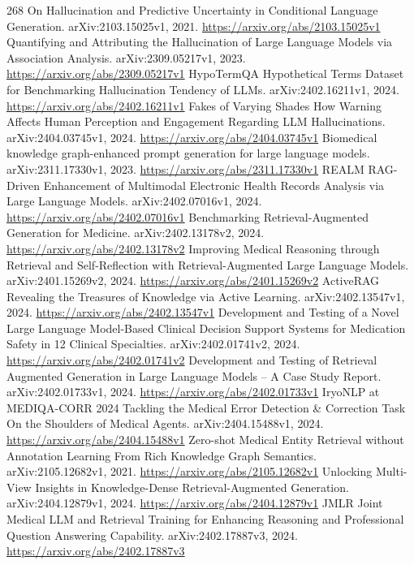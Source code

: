 \documentclass[11pt]{article}
\begin{document}
\begin{thebibliography}{268}
 On Hallucination and Predictive Uncertainty in Conditional Language Generation. arXiv:2103.15025v1, 2021. \url{https://arxiv.org/abs/2103.15025v1}
 Quantifying and Attributing the Hallucination of Large Language Models via Association Analysis. arXiv:2309.05217v1, 2023. \url{https://arxiv.org/abs/2309.05217v1}
 HypoTermQA Hypothetical Terms Dataset for Benchmarking Hallucination Tendency of LLMs. arXiv:2402.16211v1, 2024. \url{https://arxiv.org/abs/2402.16211v1}
 Fakes of Varying Shades How Warning Affects Human Perception and Engagement Regarding LLM Hallucinations. arXiv:2404.03745v1, 2024. \url{https://arxiv.org/abs/2404.03745v1}
 Biomedical knowledge graph-enhanced prompt generation for large language models. arXiv:2311.17330v1, 2023. \url{https://arxiv.org/abs/2311.17330v1}
 REALM RAG-Driven Enhancement of Multimodal Electronic Health Records Analysis via Large Language Models. arXiv:2402.07016v1, 2024. \url{https://arxiv.org/abs/2402.07016v1}
 Benchmarking Retrieval-Augmented Generation for Medicine. arXiv:2402.13178v2, 2024. \url{https://arxiv.org/abs/2402.13178v2}
 Improving Medical Reasoning through Retrieval and Self-Reflection with Retrieval-Augmented Large Language Models. arXiv:2401.15269v2, 2024. \url{https://arxiv.org/abs/2401.15269v2}
 ActiveRAG Revealing the Treasures of Knowledge via Active Learning. arXiv:2402.13547v1, 2024. \url{https://arxiv.org/abs/2402.13547v1}
 Development and Testing of a Novel Large Language Model-Based Clinical Decision Support Systems for Medication Safety in 12 Clinical Specialties. arXiv:2402.01741v2, 2024. \url{https://arxiv.org/abs/2402.01741v2}
 Development and Testing of Retrieval Augmented Generation in Large Language Models -- A Case Study Report. arXiv:2402.01733v1, 2024. \url{https://arxiv.org/abs/2402.01733v1}
 IryoNLP at MEDIQA-CORR 2024 Tackling the Medical Error Detection \& Correction Task On the Shoulders of Medical Agents. arXiv:2404.15488v1, 2024. \url{https://arxiv.org/abs/2404.15488v1}
 Zero-shot Medical Entity Retrieval without Annotation Learning From Rich Knowledge Graph Semantics. arXiv:2105.12682v1, 2021. \url{https://arxiv.org/abs/2105.12682v1}
 Unlocking Multi-View Insights in Knowledge-Dense Retrieval-Augmented Generation. arXiv:2404.12879v1, 2024. \url{https://arxiv.org/abs/2404.12879v1}
 JMLR Joint Medical LLM and Retrieval Training for Enhancing Reasoning and Professional Question Answering Capability. arXiv:2402.17887v3, 2024. \url{https://arxiv.org/abs/2402.17887v3}

\end{thebibliography}
\end{document}
